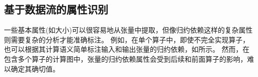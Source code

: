 


\subsection{基于数据流的属性识别}
一些基本属性(如大小)可以很容易地从张量中提取，但像归约依赖这样的复杂属性则需要复杂的分析才能准确标注。
例如，在单个算子中，即使不完全实现算子，也可以根据其计算语义简单标注输入和输出张量的归约依赖，如所示。
然而，在包含多个算子的计算图中，张量的归约依赖属性会受到后续和前面算子的影响，难以确定其确切值。

